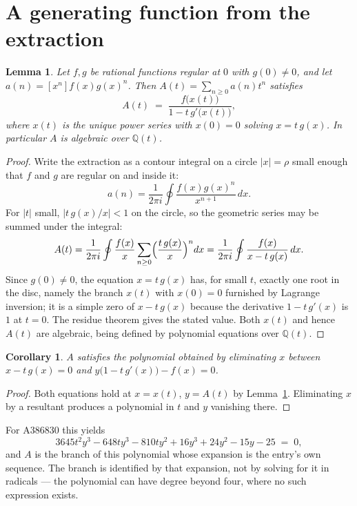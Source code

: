 \documentclass[11pt,a4paper]{article}
\theoremstyle{plain}
\newtheorem{lemma}[theorem]{Lemma}
\newtheorem{corollary}[theorem]{Corollary}
\theoremstyle{definition}
\begin{document}
\section{A generating function from the extraction}

\begin{lemma}\label{lem:diag}
Let $f,g$ be rational functions regular at $0$ with $g(0)\neq0$, and let
$a(n)=[x^{n}]f(x)g(x)^{n}$. Then $A(t)=\sum_{n\ge0}a(n)t^{n}$ satisfies
\[
A(t)\;=\;\frac{f\bigl(x(t)\bigr)}{1-t\,g'\bigl(x(t)\bigr)},
\]
where $x(t)$ is the unique power series with $x(0)=0$ solving $x=t\,g(x)$. In particular
$A$ is algebraic over $\mathbb{Q}(t)$.
\end{lemma}

\begin{proof}
Write the extraction as a contour integral on a circle $|x|=\rho$ small enough that $f$
and $g$ are regular on and inside it:
\[
a(n)=\frac{1}{2\pi i}\oint \frac{f(x)g(x)^{n}}{x^{n+1}}\,dx .
\]
For $|t|$ small, $|t\,g(x)/x|<1$ on the circle, so the geometric series may be summed
under the integral:
\[
A(t)=\frac{1}{2\pi i}\oint\frac{f(x)}{x}\sum_{n\ge0}\Bigl(\frac{t\,g(x)}{x}\Bigr)^{n}dx
     =\frac{1}{2\pi i}\oint\frac{f(x)}{x-t\,g(x)}\,dx .
\]
Since $g(0)\neq0$, the equation $x=t\,g(x)$ has, for small $t$, exactly one root in the
disc, namely the branch $x(t)$ with $x(0)=0$ furnished by Lagrange inversion; it is a
simple zero of $x-t\,g(x)$ because the derivative $1-t\,g'(x)$ is $1$ at $t=0$. The
residue theorem gives the stated value. Both $x(t)$ and hence $A(t)$ are algebraic,
being defined by polynomial equations over $\mathbb{Q}(t)$.
\end{proof}

\begin{corollary}\label{cor:minpoly}
$A$ satisfies the polynomial obtained by eliminating $x$ between
$x-t\,g(x)=0$ and $y\bigl(1-t\,g'(x)\bigr)-f(x)=0$.
\end{corollary}

\begin{proof}
Both equations hold at $x=x(t)$, $y=A(t)$ by Lemma~\ref{lem:diag}. Eliminating $x$ by a
resultant produces a polynomial in $t$ and $y$ vanishing there.
\end{proof}

For A386830 this yields
\[
3645 t^{2} y^{3} - 648 t y^{3} - 810 t y^{2} + 16 y^{3} + 24 y^{2} - 15 y - 25 \;=\;0 ,
\]
and $A$ is the branch of this polynomial whose expansion is the entry's own sequence.
The branch is identified by that expansion, not by solving for it in radicals --- the
polynomial can have degree beyond four, where no such expression exists.
\end{document}
